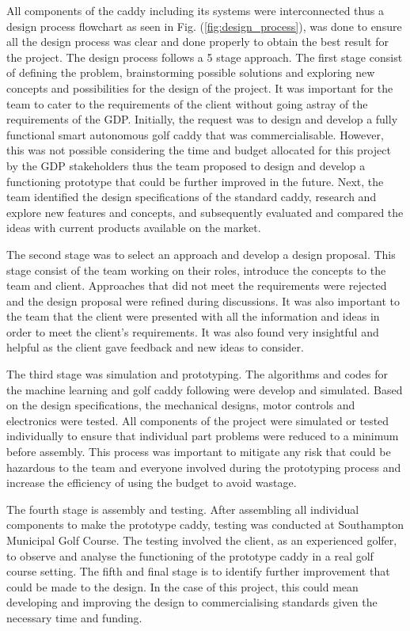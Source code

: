 \documentclass[11pt,landscape]{article}
\begin{document}
\begin{multicols}{3}
All components of the caddy including its systems were interconnected thus a
design process flowchart as seen in Fig. (\ref{fig:design_process}), was done to
ensure all the design process was clear and done properly to obtain the best
result for the project. The design process follows a 5 stage approach. The first
stage consist of defining the problem, brainstorming possible solutions and
exploring new concepts and possibilities for the design of the project. It was
important for the team to cater to the requirements of the client without going
astray of the requirements of the GDP. Initially, the request was to design and
develop a fully functional smart autonomous golf caddy that was
commercialisable. However, this was not possible considering the time and budget
allocated for this project by the GDP stakeholders thus the team proposed to
design and develop a functioning prototype that could be further improved in the
future. Next, the team identified the design specifications of the standard
caddy, research and explore new features and concepts, and subsequently
evaluated and compared the ideas with current products available on the market. 


The second stage was to select an approach and develop a design proposal. This
stage consist of the team working on their roles, introduce the concepts to the
team and client. Approaches that did not meet the requirements were rejected and
the design proposal were refined during discussions. It was also important to
the team that the client were presented with all the information and ideas in
order to meet the client’s requirements. It was also found very insightful and
helpful as the client gave feedback and new ideas to consider. 

The third stage was simulation and prototyping. The algorithms and codes for the
machine learning and golf caddy following were develop and simulated. Based on
the design specifications, the mechanical designs, motor controls and
electronics were tested. All components of the project were simulated or tested
individually to ensure that individual part problems were reduced to a minimum
before assembly. This process was important to mitigate any risk that could be
hazardous to the team and everyone involved during the prototyping process and
increase the efficiency of using the budget to avoid wastage. 

The fourth stage is assembly and testing. After assembling all individual
components to make the prototype caddy, testing was conducted at Southampton
Municipal Golf Course. The testing involved the client, as an experienced
golfer, to observe and analyse the functioning of the prototype caddy in a real
golf course setting. The fifth and final stage is to identify further
improvement that could be made to the design. In the case of this project, this
could mean developing and improving the design to commercialising standards
given the necessary time and funding. 


\end{multicols}
\end{document}
